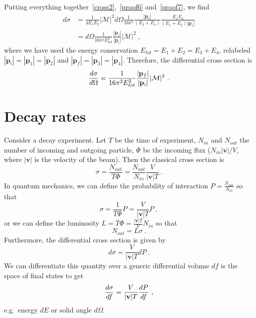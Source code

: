     Putting everything together~\eqref{cross2},~\eqref{proof6} and~\eqref{proof7}, we find
    \begin{align*}
        d \sigma & = \frac{1}{4 E_1 E_2} |\mathcal M |^2 d\Omega \frac{1}{16 \pi^2} \frac{|\mathbf p_3|}{(E_3 + E_4)} \frac{E_1 E_2}{(E_1 + E_2) |\mathbf p_1|} \\ & = d\Omega \frac{1}{16 \pi^2 E_{tot}^2} \frac{|\mathbf p_f|}{|\mathbf p_i|} |\mathcal M |^2 ~,
    \end{align*}
    where we have used the energy conservation $E_{tot} = E_1 + E_2 = E_3 + E_4$, relabeled $|\mathbf p_i| = |\mathbf p_1| = |\mathbf p_2|$ and $|\mathbf p_f| = |\mathbf p_3| = |\mathbf p_4|$.
    Therefore, the differential cross section is 
    \begin{equation*}
        \frac{d\sigma}{d\Omega} = \frac{1}{16 \pi^2 E_{tot}^2} \frac{|\mathbf p_f|}{|\mathbf p_i|} |\mathcal M |^2 ~.
    \end{equation*}

\section{Decay rates}

    Consider a decay experiment. Let $T$ be the time of experiment, $N_{in}$ and $N_{out}$ the number of incoming and outgoing particle, $\Phi$ be the incoming flux ($N_{in} |\mathbf v|  / V$, where $|\mathbf v| $ is the velocity of the beam). Then the classical cross section is 
    \begin{equation*}
        \sigma = \frac{N_{out}}{T \Phi} = \frac{N_{out}}{N_{in}} \frac{V}{|\mathbf v| T} ~.
    \end{equation*}
    In quantum mechanics, we can define the probability of interaction $P = \frac{N_{out}}{N_{in}}$ so that 
    \begin{equation*}
        \sigma = \frac{1}{T \Phi} P = \frac{V}{|\mathbf v| T} P ~,
    \end{equation*}
    or we can define the luminosity $L = T \Phi = \frac{|\mathbf v| T}{V} N_{in}$ so that
    \begin{equation*}
        N_{out} = L \sigma ~.
    \end{equation*}
    Furthermore, the differential cross section is given by    
    \begin{equation}\label{cross1}
        d \sigma = \frac{V}{|\mathbf v| T} dP ~.
    \end{equation}
    We can differentiate this quantity over a generic differential volume $df$ is the space of final states to get
    \begin{equation*}
        \frac{d\sigma}{df} = \frac{V}{|\mathbf v| T} \frac{dP}{df} ~,
    \end{equation*}
    e.g.~energy $dE$ or solid angle $d\Omega$.

